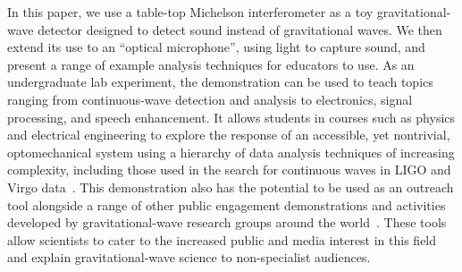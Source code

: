 \documentclass[paper-main.tex]{subfiles}
\begin{document}
In this paper, we use a table-top Michelson interferometer as a toy gravitational-wave detector designed to detect sound instead of gravitational waves. 
We then extend its use to an ``optical microphone'', using light to capture sound, and present a range of example analysis techniques for educators to use. 
As an undergraduate lab experiment, the demonstration can be used to teach topics ranging from continuous-wave detection and analysis to electronics, signal processing, and speech enhancement. 
It allows students in courses such as physics and electrical engineering to explore the response of an accessible, yet nontrivial, optomechanical system using a hierarchy of data analysis techniques of increasing complexity, including those used in the search for continuous waves in LIGO and Virgo data~\cite{ScoX1O2Viterbi:2019, SuvorovaEtAl:2017,SuvorovaEtAl:2016}. 
This demonstration also has the potential to be used as an outreach tool alongside a range of other public engagement demonstrations and activities developed by gravitational-wave research groups around the world~\cite{TTExhibit:2020,CavagliaExhibit:2009, LIGOScienceEducationCentre:online, GravityDiscoveryCentre:online, GWOSC:online, LOSC:2015, LaserLabs:online, SciVR:online,chirp:online, BlackHoleHunter:online, ArthurJeffesMusic:online, GravitySynthLeonTrimble:online}. 
These tools allow scientists to cater to the increased public and media interest in this field and explain gravitational-wave science to non-specialist audiences.
\end{document}
